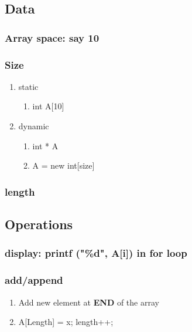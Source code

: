 \documentclass{article}
\begin{document}
\subsection{Data}
\label{sec:org399deda}
\subsubsection{Array space: say 10}
\label{sec:orga8840b1}
\subsubsection{Size}
\label{sec:org397dcf7}
\begin{enumerate}
\item static
\label{sec:orgbf0a076}
\begin{enumerate}
\item int A[10]
\label{sec:org461df5f}
\end{enumerate}
\item dynamic
\label{sec:org3c3d68a}
\begin{enumerate}
\item int * A
\label{sec:org0f9fd8a}
\item A = new int[size]
\label{sec:org7bc2d6d}
\end{enumerate}
\end{enumerate}
\subsubsection{length}
\label{sec:orgc663e88}
\subsection{Operations}
\label{sec:orgf87725b}
\subsubsection{display: printf ("\%d", A[i]) in for loop}
\label{sec:org56b074a}
\subsubsection{add/append}
\label{sec:org4e035e8}
\begin{enumerate}
\item Add new element at \textbf{END} of the array
\label{sec:org9982f58}
\item A[Length] = x; length++;
\label{sec:org7ec26ea}
\end{enumerate}
\end{document}
